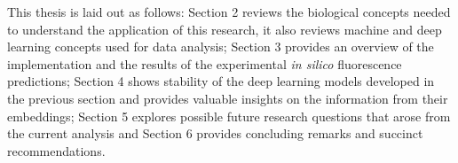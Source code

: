 This thesis is laid out as follows: Section 2 reviews the biological concepts needed to understand the application of this research, it also reviews machine and deep learning concepts used for data analysis; Section 3 provides an overview of the implementation and the results of the experimental \textit{in silico} fluorescence predictions; Section 4 shows stability of the deep learning models developed in the previous section and provides valuable insights on the information from their embeddings; Section 5 explores possible future research questions that arose from the current analysis and Section 6 provides concluding remarks and succinct recommendations.